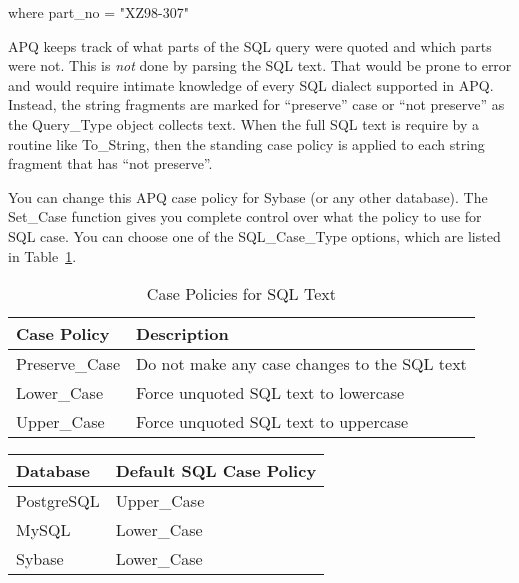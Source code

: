 \documentclass[english,letterpaper]{book}
\begin{document}
\begin{SQL}

   where part_no = "XZ98-307"

\end{SQL}

APQ keeps track of what parts of the SQL query were quoted and which
parts were not. This is \emph{not} done by parsing the SQL text. That
would be prone to error and would require intimate knowledge of every
SQL dialect supported in APQ. Instead, the string fragments are marked
for ``preserve'' case or ``not preserve'' as the Query\_Type
object collects text. When the full SQL text is require by a routine
like To\_String, then the standing case policy is applied to each
string fragment that has ``not preserve''.

You can change this APQ case policy for Sybase (or any other database).
The Set\_Case function gives you complete control over what the policy
to use for SQL case. You can choose one of the SQL\_Case\_Type\label{SQL_Case_Type Choices}
 options, which are listed in Table~\ref{t:cpolicies}.

\begin{table}
   \begin{center}
      \begin{tabular}{ll}
         Case Policy    &  Description\\
         \hline 
         Preserve\_Case &  Do not make any case changes to the SQL text\\
         Lower\_Case    &  Force unquoted SQL text to lowercase\\
         Upper\_Case    &  Force unquoted SQL text to uppercase\\
      \end{tabular}
   \end{center}
   \caption{Case Policies for SQL Text}\label{t:cpolicies}
\end{table}

\begin{floatingtable}{
   \begin{tabular}{ll}
   Database       &  Default SQL Case Policy\\
   \hline 
   PostgreSQL     &  Upper\_Case\\
   MySQL          &  Lower\_Case\\
   Sybase         &  Lower\_Case\\
   \end{tabular}}
\caption{Default Case Policies}\label{t:dfcpol}
\end{floatingtable}
\end{document}

